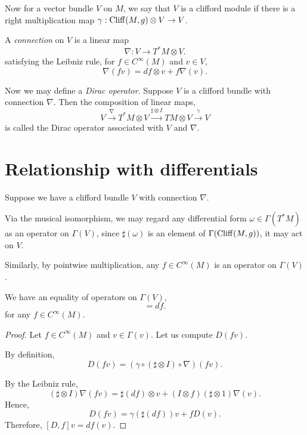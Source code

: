 Now for a vector bundle $V$ on $M$, we say that $V$ is a clifford module
if there is a right multiplication map $\gamma:\operatorname{Cliff}(M,g) \otimes V\rightarrow V$. 

A \emph{connection} on $V$ is a linear map
\begin{equation}
    \nabla:V\rightarrow T^*M\otimes V.
\end{equation}
satisfying the Leibniz rule, for $f \in C^\infty(M)$ and $v \in V$,
\begin{equation}
    \nabla(fv) = df \otimes v +f\nabla(v).
\end{equation}

Now we may define a \emph{Dirac operator}. Suppose $V$
is a clifford bundle with connection $\nabla$. Then the composition of linear maps,
\begin{equation}
    V \xrightarrow{\nabla} T^*M \otimes V \xrightarrow{\sharp\otimes I} TM\otimes V \xrightarrow{\gamma} V
\end{equation}
is called the Dirac operator associated with $V$ and $\nabla$. 

\section{Relationship with differentials}
Suppose we have a clifford bundle $V$ with connection $\nabla$. 

Via the musical isomorphism, we may regard any differential form $\omega \in \Gamma(T^*M)$
as an operator on $\Gamma(V)$, since $\sharp(\omega)$ is an element of $\Gamma(\operatorname{Cliff}(M,g))$,
it may act on $V$.

Similarly, by pointwise multiplication, any $f \in C^\infty(M)$ is an operator
on $\Gamma(V)$. 
\begin{theorem}
    We have an equality of operators on $\Gamma(V)$,
    \begin{equation}
        [D,f] = df.
    \end{equation}
    for any $f \in C^\infty(M)$.
\end{theorem}
\begin{proof}
    Let $f \in C^\infty(M)$ and $v \in \Gamma(v)$. Let 
    us compute $D(fv)$.
    
    By definition,
    \begin{equation}
        D(fv) = (\gamma\circ(\sharp\otimes I)\circ\nabla)(fv).
    \end{equation}
    
    By the Leibniz rule,
    \begin{equation}
        (\sharp\otimes I)\nabla(fv) = \sharp(df)\otimes v + (I\otimes f)(\sharp \otimes 1)\nabla(v).
    \end{equation}
    Hence,
    \begin{equation}
        D(fv) = \gamma(\sharp(df))v + fD(v).
    \end{equation}
    Therefore, $[D,f]v = df(v)$.
\end{proof}
